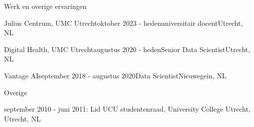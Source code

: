 \documentclass{resume} %
\begin{document}
\begin{rSection}{Werk en overige ervaringen}

\begin{rSubsection}{Julius Centrum, UMC Utrecht}{oktober 2023 - heden}{universitair docent}{Utrecht, NL}
\vspace{-1.5em}
\end{rSubsection}

\begin{rSubsection}{Digital Health, UMC Utrecht}{augustus 2020 - heden}{Senior Data Scientist}{Utrecht, NL}
\vspace{-1.5em}
\end{rSubsection}

\begin{rSubsection}{Vantage AI}{september 2018 - augustus 2020}{Data Scientist}{Nieuwegein, NL}
\vspace{-1.5em}
\end{rSubsection}

\begin{rSubsection}{Overige}{}{}{}
\vspace{-1.5em}
	\item september 2010 - juni 2011: Lid UCU studentenraad, University College Utrecht, Utrecht, NL
\end{rSubsection}

\end{rSection}



\end{document}
